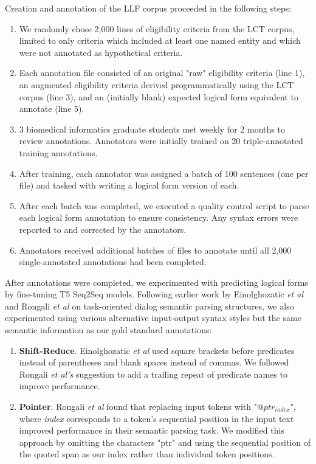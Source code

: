 \documentclass[../main.tex]{subfiles}
\begin{document}
Creation and annotation of the LLF corpus proceeded in the following steps:

\begin{enumerate}
    \item We randomly chose 2,000 lines of eligibility criteria from the LCT corpus, limited to only criteria which included at least one named entity and which were not annotated as hypothetical criteria.
    \item  Each annotation file consisted of an original "raw" eligibility criteria (line 1), an augmented eligibility criteria derived programmatically using the LCT corpus (line 3), and an (initially blank) expected logical form equivalent to annotate (line 5).
    \item 3 biomedical informatics graduate students met weekly for 2 months to review annotations. Annotators were initially trained on 20 triple-annotated training annotations. 
    \item After training, each annotator was assigned a batch of 100 sentences (one per file) and tasked with writing a logical form version of each.
    \item After each batch was completed, we executed a quality control script to parse each logical form annotation to ensure consistency. Any syntax errors were reported to and corrected by the annotators.
    \item Annotators received additional batches of files to annotate until all 2,000 single-annotated annotations had been completed.
\end{enumerate}

After annotations were completed, we experimented with predicting logical forms by fine-tuning T5 \cite{raffel2020exploring} Seq2Seq models. Following earlier work by Einolghozatic \textit{et al} \cite{einolghozati2019improving} and Rongali \textit{et al} \cite{rongali2020don} on task-oriented dialog semantic parsing structures, we also experimented using various alternative input-output syntax styles but the same semantic information as our gold standard annotations:

\begin{enumerate}
    \item \textbf{Shift-Reduce}. Einolghozatic \textit{et al} \cite{einolghozati2019improving} used square brackets before predicates instead of parentheses and blank spaces instead of commas. We followed Rongali \textit{et al's} suggestion to add a trailing repeat of predicate names to improve performance.
    \item \textbf{Pointer}. Rongali \textit{et al} found that replacing input tokens with "$@ptr_{index}$", where \textit{index} corresponds to a token's sequential position in the input text improved performance in their semantic parsing task. We modified this approach by omitting the characters "ptr" and using the sequential position of the quoted span as our index rather than individual token positions.
\end{enumerate}
\end{document}
